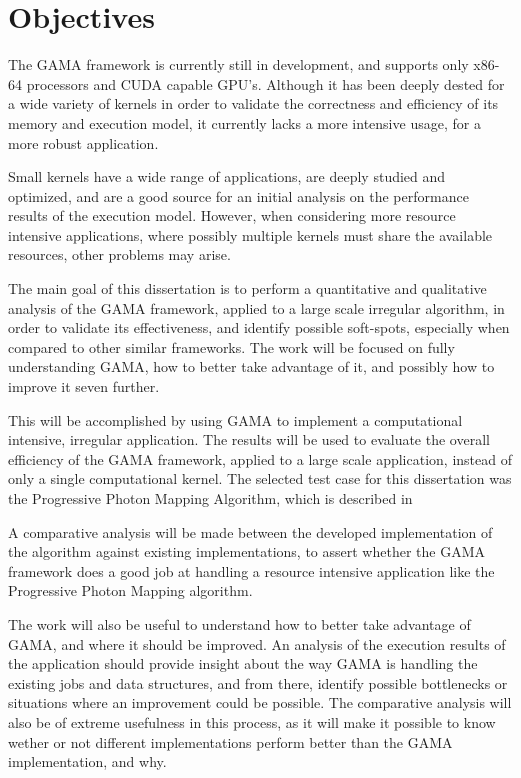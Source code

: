 \section{Objectives}

The GAMA framework is currently still in development, and supports only x86-64 processors and CUDA capable GPU's. Although it has been deeply dested for a wide variety of kernels in order to validate the correctness and efficiency of its memory and execution model, it currently lacks a more intensive usage, for a more robust application.

Small kernels have a wide range of applications, are deeply studied and optimized, and are a good source for an initial analysis on the performance results of the execution model. However, when considering more resource intensive applications, where possibly multiple kernels must share the available resources, other problems may arise.

The main goal of this dissertation is to perform a quantitative and qualitative analysis of the GAMA framework, applied to a large scale irregular algorithm, in order to validate its effectiveness, and identify possible soft-spots, especially when compared to other similar frameworks. The work will be focused on fully understanding GAMA, how to better take advantage of it, and possibly how to improve it seven further. 

This will be accomplished by using GAMA to implement a computational intensive, irregular application. The results will be used to evaluate the overall efficiency of the GAMA framework, applied to a large scale application, instead of only a single computational kernel. The selected test case for this dissertation was the Progressive Photon Mapping Algorithm, which is described in 

A comparative analysis will be made between the developed implementation of the algorithm against existing implementations, to assert whether the GAMA framework does a good job at handling a resource intensive application like the Progressive Photon Mapping algorithm.

The work will also be useful to understand how to better take advantage of GAMA, and where it should be improved. An analysis of the execution results of the application should provide insight about the way GAMA is handling the existing jobs and data structures, and from there, identify possible bottlenecks or situations where an improvement could be possible.
The comparative analysis will also be of extreme usefulness in this process, as it will make it possible to know wether or not different implementations perform better than the GAMA implementation, and why. 


